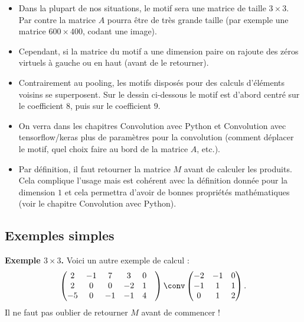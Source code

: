 \documentclass[11pt,class=report,crop=false]{standalone}
\begin{document}
  
\begin{remarque*}
\sauteligne
\begin{itemize}
  \item Dans la plupart de nos situations, le motif sera une matrice de taille $3 \times 3$. Par contre la matrice $A$ pourra être de très grande taille (par exemple une matrice $600 \times 400$, codant une image).
  
  \item Cependant, si la matrice du motif a une dimension paire on rajoute des zéros virtuels à gauche ou en haut (avant de le retourner).

   
\item Contrairement au pooling, les motifs disposés pour des calculs d'éléments voisins se superposent.
  Sur le dessin ci-dessous le motif est d'abord centré sur le coefficient $8$, puis sur le coefficient $9$.
  
  
  \item On verra dans les chapitres \og{}Convolution avec Python\fg{} et \og{}Convolution avec tensorflow/keras\fg{}
  plus de paramètres pour la convolution (comment déplacer le motif, quel choix faire au bord de la matrice $A$, etc.).
  
  \item Par définition, il faut retourner la matrice $M$ avant de calculer les produits. Cela complique l'usage mais est cohérent avec la définition donnée pour la dimension $1$ et cela permettra d'avoir de bonnes propriétés mathématiques (voir le chapitre \og{}Convolution avec Python\fg{}).
\end{itemize}
\end{remarque*} 

\subsection{Exemples simples}

\textbf{Exemple $3\times3$.} Voici un autre exemple de calcul :
$$\begin{pmatrix}
2& -1 & 7 & 3 & 0 & \\
2 & 0 & 0 & -2 & 1 & \\
-5 & 0 & -1 & -1 & 4 & \\
\end{pmatrix}
\conv
\begin{pmatrix}
-2 & -1 & 0 \\
-1 & 1 & 1 \\
 0 & 1 & 2 \\
\end{pmatrix}.
$$
Il ne faut pas oublier de retourner $M$ avant de commencer !
\end{document}
